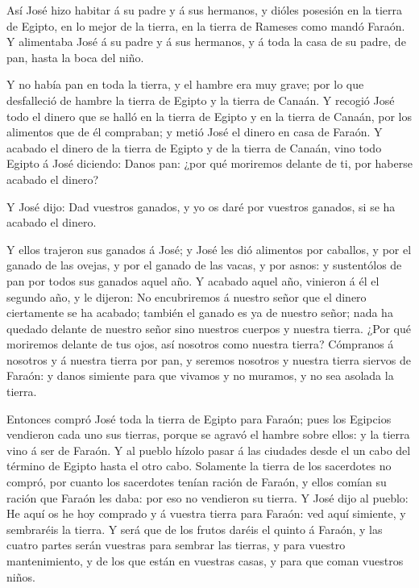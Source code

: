  Así José hizo habitar á su padre y á sus hermanos, y
dióles posesión en la tierra de Egipto, en lo mejor de la tierra, en la
tierra de Rameses como mandó Faraón.  Y alimentaba José á
su padre y á sus hermanos, y á toda la casa de su padre, de pan, hasta
la boca del niño.

 Y no había pan en toda la tierra, y el hambre era muy
grave; por lo que desfalleció de hambre la tierra de Egipto y la tierra
de Canaán.  Y recogió José todo el dinero que se halló en
la tierra de Egipto y en la tierra de Canaán, por los alimentos que de
él compraban; y metió José el dinero en casa de Faraón.  Y
acabado el dinero de la tierra de Egipto y de la tierra de Canaán, vino
todo Egipto á José diciendo: Danos pan: ¿por qué moriremos delante de
ti, por haberse acabado el dinero?

 Y José dijo: Dad vuestros ganados, y yo os daré por
vuestros ganados, si se ha acabado el dinero.

 Y ellos trajeron sus ganados á José; y José les dió
alimentos por caballos, y por el ganado de las ovejas, y por el ganado
de las vacas, y por asnos: y sustentólos de pan por todos sus ganados
aquel año.  Y acabado aquel año, vinieron á él el segundo
año, y le dijeron: No encubriremos á nuestro señor que el dinero
ciertamente se ha acabado; también el ganado es ya de nuestro señor;
nada ha quedado delante de nuestro señor sino nuestros cuerpos y nuestra
tierra.  ¿Por qué moriremos delante de tus ojos, así
nosotros como nuestra tierra? Cómpranos á nosotros y á nuestra tierra
por pan, y seremos nosotros y nuestra tierra siervos de Faraón: y danos
simiente para que vivamos y no muramos, y no sea asolada la tierra.

 Entonces compró José toda la tierra de Egipto para Faraón;
pues los Egipcios vendieron cada uno sus tierras, porque se agravó el
hambre sobre ellos: y la tierra vino á ser de Faraón.  Y al
pueblo hízolo pasar á las ciudades desde el un cabo del término de
Egipto hasta el otro cabo.  Solamente la tierra de los
sacerdotes no compró, por cuanto los sacerdotes tenían ración de Faraón,
y ellos comían su ración que Faraón les daba: por eso no vendieron su
tierra.  Y José dijo al pueblo: He aquí os he hoy comprado
y á vuestra tierra para Faraón: ved aquí simiente, y sembraréis la
tierra.  Y será que de los frutos daréis el quinto á
Faraón, y las cuatro partes serán vuestras para sembrar las tierras, y
para vuestro mantenimiento, y de los que están en vuestras casas, y para
que coman vuestros niños.

